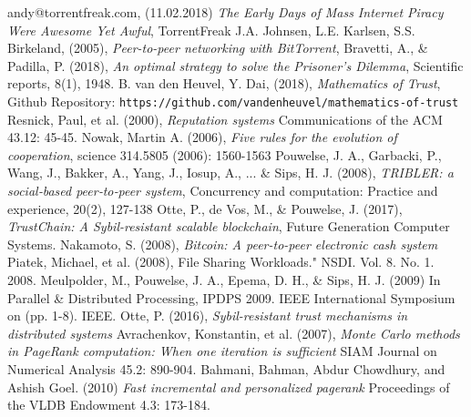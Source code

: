 \documentclass[twocolumn]{article}
\theoremstyle{definition}
\theoremstyle{theorem}
\begin{document}
\begin{thebibliography}{9}
andy@torrentfreak.com, (11.02.2018)
\textit{The Early Days of Mass Internet Piracy Were Awesome Yet Awful},
TorrentFreak
J.A. Johnsen, L.E. Karlsen, S.S. Birkeland, (2005),
\textit{Peer-to-peer networking with BitTorrent},
Bravetti, A., \& Padilla, P. (2018), 
\textit{An optimal strategy to solve the Prisoner's Dilemma},
Scientific reports, 8(1), 1948.
B. van den Heuvel, Y. Dai, (2018),
\textit{Mathematics of Trust},
Github Repository: \hspace{0.3em} {\tt https://github.com/vandenheuvel/mathematics-of-trust}
Resnick, Paul, et al. (2000),
\textit{Reputation systems} 
Communications of the ACM 43.12: 45-45.
Nowak, Martin A. (2006),
\textit{Five rules for the evolution of cooperation},
science 314.5805 (2006): 1560-1563
Pouwelse, J. A., Garbacki, P., Wang, J., Bakker, A., Yang, J., Iosup, A., ... \& Sips, H. J. (2008),
\textit{TRIBLER: a social‐based peer‐to‐peer system},
Concurrency and computation: Practice and experience, 20(2), 127-138
Otte, P., de Vos, M., \& Pouwelse, J. (2017),
\textit{TrustChain: A Sybil-resistant scalable blockchain},
Future Generation Computer Systems.
Nakamoto, S. (2008),
\textit{Bitcoin: A peer-to-peer electronic cash system}
Piatek, Michael, et al. (2008), 
File Sharing Workloads." NSDI. Vol. 8. No. 1. 2008.
Meulpolder, M., Pouwelse, J. A., Epema, D. H., \& Sips, H. J. (2009)
In Parallel \& Distributed Processing, IPDPS 2009. IEEE International Symposium on (pp. 1-8). IEEE.
Otte, P. (2016),
\textit{Sybil-resistant trust mechanisms in distributed systems}
Avrachenkov, Konstantin, et al. (2007), 
\textit{Monte Carlo methods in PageRank computation: When one iteration is sufficient}
SIAM Journal on Numerical Analysis 45.2: 890-904.
Bahmani, Bahman, Abdur Chowdhury, and Ashish Goel. (2010)
\textit{Fast incremental and personalized pagerank}
Proceedings of the VLDB Endowment 4.3: 173-184.





\end{thebibliography}
\end{document}

